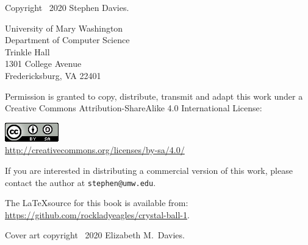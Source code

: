 
\thispagestyle{empty}

Copyright \textcopyright \ 2020 Stephen Davies.

\bigskip

University of Mary Washington\\
Department of Computer Science\\
Trinkle Hall\\
1301 College Avenue\\
Fredericksburg, VA  22401

\vspace{.4in}

Permission is granted to copy, distribute, transmit and adapt this work under a
Creative Commons Attribution-ShareAlike 4.0 International License:

\vspace{-.2in}
\begin{center}
\includegraphics{cc_license.png}\\
\smallskip
\url{http://creativecommons.org/licenses/by-sa/4.0/}
\end{center}

\vspace{.1in}
If you are interested in distributing a commercial version of this work, please
contact the author at \texttt{stephen@umw.edu}.

\vspace{1.6in}
The \LaTeX source for this book is available from:
\url{https://github.com/rockladyeagles/crystal-ball-1}.

\vspace{.4in}
Cover art copyright \textcopyright \ 2020 Elizabeth M.~Davies.
